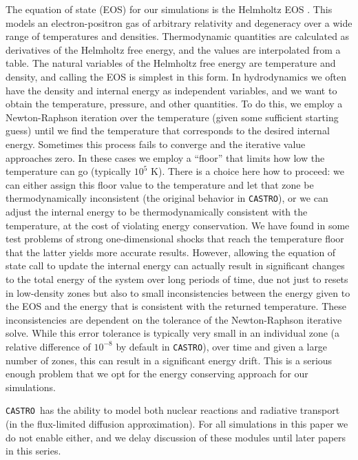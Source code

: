 \documentclass[iop,numberedappendix]{../emulateapj}
\newcommand{\castro}{\texttt{CASTRO}}
\begin{document}
The equation of state (EOS) for our simulations is the Helmholtz EOS
\citep{timmes_swesty:2000}. This models an electron-positron gas of
arbitrary relativity and degeneracy over a wide range of temperatures
and densities. Thermodynamic quantities are calculated as derivatives
of the Helmholtz free energy, and the values are interpolated from a
table. The natural variables of the Helmholtz free energy are
temperature and density, and calling the EOS is simplest in this
form. In hydrodynamics we often have the density and
internal energy as independent variables, and we want to obtain the
temperature, pressure, and other quantities. To do this, we employ a
Newton-Raphson iteration over the temperature (given some sufficient
starting guess) until we find the temperature that corresponds to the
desired internal energy. Sometimes this process fails to converge and
the iterative value approaches zero. In these cases we employ a
``floor'' that limits how low the temperature can go (typically 
$10^5$ K). There is a choice here how to proceed: we can either
assign this floor value to the temperature and let that zone be
thermodynamically inconsistent (the original behavior in \castro), or
we can adjust the internal energy to be thermodynamically consistent
with the temperature, at the cost of violating energy conservation. We
have found in some test problems of strong one-dimensional shocks that reach 
the temperature floor that the latter yields more accurate results. 
However, allowing the equation of state call to update the 
internal energy can actually result in significant changes to the 
total energy of the system over long periods of time, 
due not just to resets in low-density zones but also to small 
inconsistencies between the energy given to the EOS and the energy 
that is consistent with the returned temperature. These inconsistencies
are dependent on the tolerance of the Newton-Raphson iterative solve.
While this error tolerance is typically very small in an individual zone (a relative 
difference of $10^{-8}$ by default in \castro), over time and given 
a large number of zones, this can result in a significant energy 
drift. This is a serious enough problem that we opt for the energy 
conserving approach for our simulations.

\castro\ has the ability to model both nuclear reactions and radiative 
transport (in the flux-limited diffusion approximation). For all simulations 
in this paper we do not enable either, and we delay discussion of 
these modules until later papers in this series.
\end{document}
